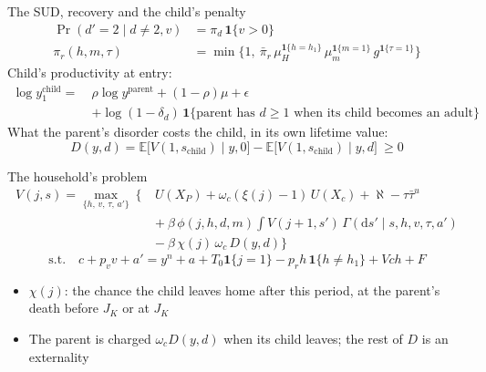 \documentclass[aspectratio=169,11pt]{beamer}
\begin{document}
\begin{frame}{The SUD, recovery and the child's penalty}
\begin{align*}
\Pr(d'=2\mid d\neq2,v)&=\pi_d\,\mathbf{1}\{v>0\}\\
\pi_r(h,m,\tau)&=\min\big\{1,\ \bar\pi_r\,\mu_H^{\mathbf{1}\{h=h_1\}}\,\mu_m^{\mathbf{1}\{m=1\}}\,g^{\mathbf{1}\{\tau=1\}}\big\}
\end{align*}
\vspace{-0.2cm}
Child's productivity at entry:
\[
\begin{aligned}
\log y_{1}^{\text{child}}=\ &\rho\log y^{\text{parent}}+(1-\rho)\mu+\epsilon\\
&+\log(1-\delta_d)\,\mathbf{1}\{\text{parent has } d\ge1 \text{ when its child becomes an adult}\}
\end{aligned}
\]
What the parent's disorder costs the child, in its own lifetime value:
\[
D(y,d)=\mathbb{E}\big[V(1,s_{\text{child}})\mid y,0\big]-\mathbb{E}\big[V(1,s_{\text{child}})\mid y,d\big]\ \ge 0
\]
\end{frame}

\begin{frame}{The household's problem}
\[
\begin{aligned}
V(j,s)=\max_{\{h,\,v,\,\tau,\,a'\}}\ \Big\{\
&U(X_P)+\omega_c(\xi(j)-1)\,U(X_c)+\aleph-\tau\bar\tau^{u}\\
&+\ \beta\,\phi(j,h,d,m)\int V(j{+}1,s')\,\Gamma(\mathrm{d}s'\mid s,h,v,\tau,a')\\
&-\ \beta\,\chi(j)\,\omega_c\,D(y,d)\Big\}
\end{aligned}
\]
\[
\text{s.t.}\quad c+p_v v+a'=y^{n}+a+T_0\mathbf{1}\{j=1\}-p_r h\,\mathbf{1}\{h\neq h_1\}+V\!ch+F
\]
\begin{itemize}
\item $\chi(j)$: the chance the child leaves home after this period, at the parent's death before $J_K$ or at $J_K$
\item The parent is charged $\omega_c D(y,d)$ when its child leaves; the rest of $D$ is an externality
\end{itemize}
\end{frame}
\end{document}
